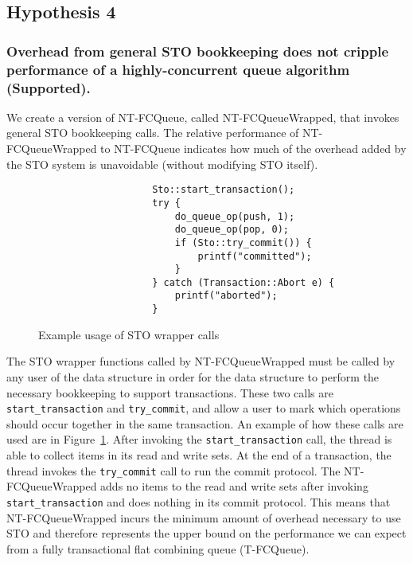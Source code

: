\subsection{Hypothesis 4}
\subsubsection{Overhead from general STO bookkeeping does not cripple performance of a highly-concurrent queue algorithm (Supported).}

We create a version of NT-FCQueue, called NT-FCQueueWrapped, that invokes general STO bookkeeping calls. The relative performance of NT-FCQueueWrapped to NT-FCQueue indicates how much of the overhead added by the STO system is unavoidable (without modifying STO itself). 

\begin{figure}[t!]
\centering
\singlespace
{}
	\begin{lstlisting}
                    Sto::start_transaction();
                    try {
                        do_queue_op(push, 1);
                        do_queue_op(pop, 0);
                        if (Sto::try_commit()) {
                            printf("committed");
                        }
                    } catch (Transaction::Abort e) {
                        printf("aborted");
                    }
	\end{lstlisting}
\caption{Example usage of STO wrapper calls}
\label{fig:wrappers}
\end{figure}
The STO wrapper functions called by NT-FCQueueWrapped must be called by any user of the data structure in order for the data structure to perform the necessary bookkeeping to support transactions.
These two calls are \texttt{start\_transaction} and \texttt{try\_commit}, and allow a user to mark which operations should occur together in the same transaction. An example of how these calls are used are in Figure~\ref{fig:wrappers}. After invoking the \texttt{start\_transaction} call, the thread is able to collect items in its read and write sets. At the end of a transaction, the thread invokes the \texttt{try\_commit} call to run the commit protocol. The NT-FCQueueWrapped adds no items to the read and write sets after invoking \texttt{start\_transaction} and does nothing in its commit protocol. This means that NT-FCQueueWrapped incurs the minimum amount of overhead necessary to use STO and therefore represents the upper bound on the performance we can expect from a fully transactional flat combining queue (T-FCQueue). 

